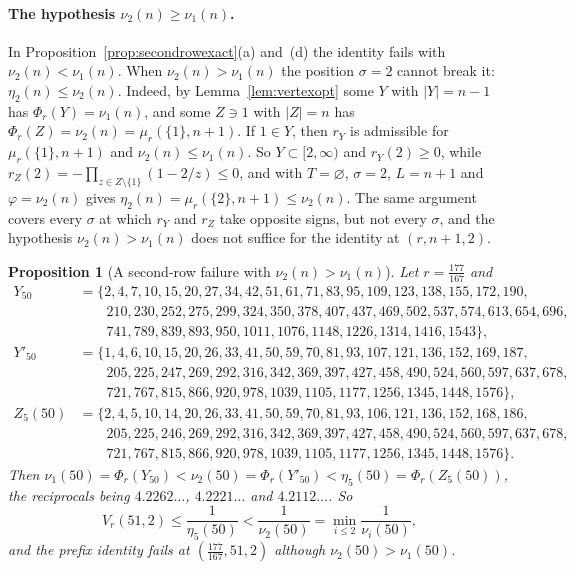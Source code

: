 \documentclass[11pt]{article}
\newtheorem{proposition}[theorem]{Proposition}
\begin{document}
\paragraph{The hypothesis $\nu_2(n)\ge\nu_1(n)$.}
In Proposition~\ref{prop:secondrowexact}(a) and~(d) the identity fails
with $\nu_2(n)<\nu_1(n)$.  When
$\nu_2(n)>\nu_1(n)$ the position $\sigma=2$ cannot break it:
$\eta_2(n)\le\nu_2(n)$.  Indeed, by Lemma~\ref{lem:vertexopt} some $Y$ with
$|Y|=n-1$ has $\Phi_r(Y)=\nu_1(n)$, and some $Z\ni1$ with $|Z|=n$ has
$\Phi_r(Z)=\nu_2(n)=\mu_r(\{1\},n+1)$.  If $1\in Y$, then $r_Y$ is
admissible for $\mu_r(\{1\},n+1)$ and $\nu_2(n)\le\nu_1(n)$.  So
$Y\subset[2,\infty)$ and $r_Y(2)\ge0$, while
$r_Z(2)=-\prod_{z\in Z\setminus\{1\}}(1-2/z)\le0$, and
\cite[Lemma~4.1(a)]{coefficient-mass-rows} with $T=\varnothing$, $\sigma=2$, $L=n+1$ and
$\varphi=\nu_2(n)$ gives $\eta_2(n)=\mu_r(\{2\},n+1)\le\nu_2(n)$.  The same
argument covers every $\sigma$ at which $r_Y$ and $r_Z$ take opposite
signs, but not every $\sigma$, and the hypothesis $\nu_2(n)>\nu_1(n)$
does not suffice for the identity at $(r,n+1,2)$.

\begin{proposition}[A second-row failure with $\nu_2(n)>\nu_1(n)$]\label{prop:secondrowhyp}
Let $r=\frac{177}{167}$ and
\begin{align*}
  Y_{50}&=\{2,4,7,10,15,20,27,34,42,51,61,71,83,95,109,123,138,155,172,190,\\
  &\qquad210,230,252,275,299,324,350,378,407,437,469,502,537,574,613,654,696,\\
  &\qquad741,789,839,893,950,1011,1076,1148,1226,1314,1416,1543\},\\
  Y'_{50}&=\{1,4,6,10,15,20,26,33,41,50,59,70,81,93,107,121,136,152,169,187,\\
  &\qquad205,225,247,269,292,316,342,369,397,427,458,490,524,560,597,637,678,\\
  &\qquad721,767,815,866,920,978,1039,1105,1177,1256,1345,1448,1576\},\\
  Z_5(50)&=\{2,4,5,10,14,20,26,33,41,50,59,70,81,93,106,121,136,152,168,186,\\
  &\qquad205,225,246,269,292,316,342,369,397,427,458,490,524,560,597,637,678,\\
  &\qquad721,767,815,866,920,978,1039,1105,1177,1256,1345,1448,1576\}.
\end{align*}
Then $\nu_1(50)=\Phi_r(Y_{50})<\nu_2(50)=\Phi_r(Y'_{50})<
\eta_5(50)=\Phi_r(Z_5(50))$, the reciprocals being $4.2262\ldots$,
$4.2221\ldots$ and $4.2112\ldots$.  So
\[
  V_r(51,2)\le\frac1{\eta_5(50)}<\frac1{\nu_2(50)}=\min_{i\le2}\frac1{\nu_i(50)},
\]
and the prefix identity fails at $(\frac{177}{167},51,2)$ although
$\nu_2(50)>\nu_1(50)$.
\end{proposition}
\end{document}

